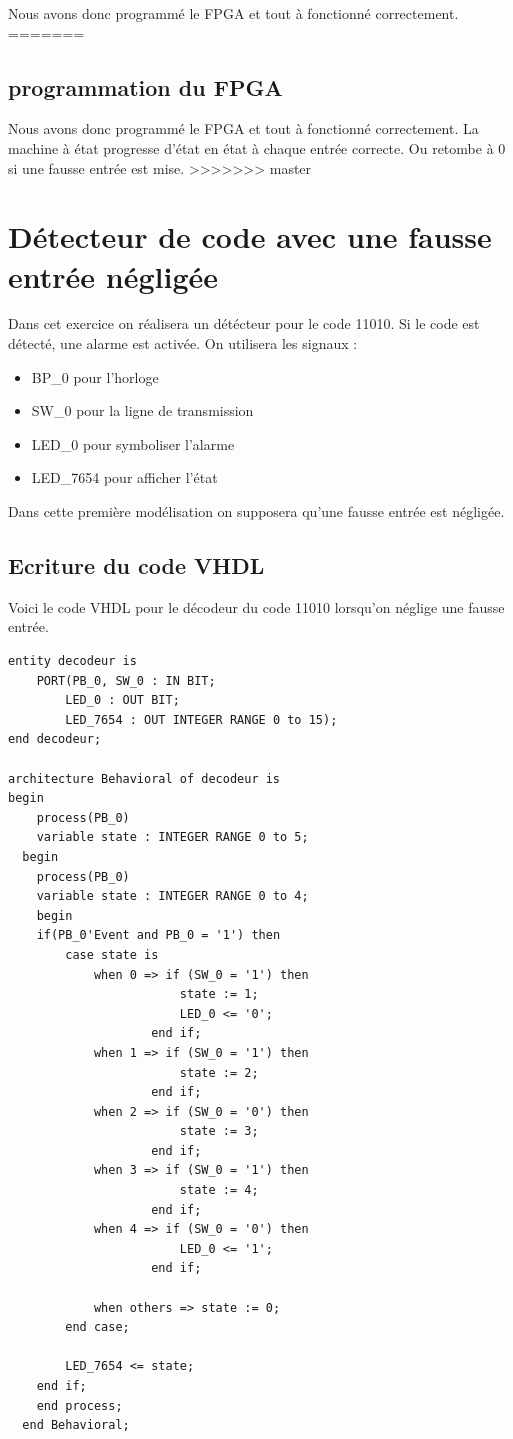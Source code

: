 \documentclass[11pt]{report}
\begin{document}
Nous avons donc programmé le FPGA et tout à fonctionné correctement.
=======
  
  
   \subsection{ programmation du FPGA}

Nous avons donc programmé le FPGA et tout à fonctionné correctement. La machine à état progresse d'état en état à chaque entrée correcte. Ou retombe à 0 si une fausse entrée est mise. 
>>>>>>> master

\section{Détecteur de code avec une fausse entrée négligée}

Dans cet exercice on réalisera un détécteur pour le code 11010. Si le code est détecté, une alarme est activée. On utilisera les signaux :
\begin{itemize}
	\item BP\_0 pour l'horloge
	\item SW\_0 pour la ligne de transmission
	\item LED\_0 pour symboliser l'alarme
	\item LED\_7654 pour afficher l'état

\end{itemize}

Dans cette première modélisation on supposera qu'une fausse entrée est négligée.

\subsection{Ecriture du code VHDL}

Voici le code VHDL pour le décodeur du code 11010 lorsqu'on néglige une fausse entrée.

\begin{lstlisting}
entity decodeur is
	PORT(PB_0, SW_0 : IN BIT;
		LED_0 : OUT BIT;
		LED_7654 : OUT INTEGER RANGE 0 to 15);
end decodeur;

architecture Behavioral of decodeur is
begin
	process(PB_0)
	variable state : INTEGER RANGE 0 to 5;
  begin
  	process(PB_0)
  	variable state : INTEGER RANGE 0 to 4;
  	begin
  	if(PB_0'Event and PB_0 = '1') then
  		case state is
  			when 0 => if (SW_0 = '1') then
  						state := 1;
  						LED_0 <= '0';
  					end if;
  			when 1 => if (SW_0 = '1') then
  						state := 2;
  					end if;
  			when 2 => if (SW_0 = '0') then
  						state := 3;
  					end if;
  			when 3 => if (SW_0 = '1') then
  						state := 4;
  					end if;
  			when 4 => if (SW_0 = '0') then
  						LED_0 <= '1';
  					end if;

  			when others => state := 0;
  		end case;

  		LED_7654 <= state;
  	end if;
  	end process;
  end Behavioral;

\end{lstlisting}
\end{document}

